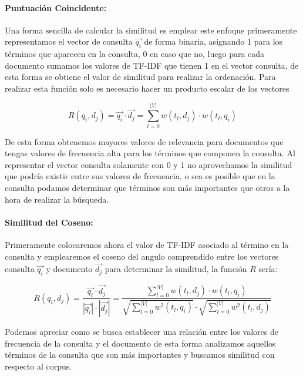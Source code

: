 \documentclass[runningheads,a4paper]{llncs}
\begin{document}
\paragraph{Puntuación Coincidente:} Una forma sencilla de calcular la similitud es emplear este enfoque primeramente representamos el vector de consulta $\overrightarrow{q_i}$ de forma binaria, asignando 1 para los términos que aparecen en la consulta, 0 en caso que no, luego para cada documento sumamos los valores de TF-IDF que tienen 1 en el vector consulta, de esta forma se obtiene el valor de similitud para realizar la ordenación.
Para realizar esta función solo es necesario hacer un producto escalar de los vectores

\begin{equation}
	R(q_i, d_j) = \overrightarrow{q_i} \cdot \overrightarrow{d_j} = \sum_{l = 0}^{|V|} w(t_l, d_j) \cdot w(t_l, q_i)
\end{equation}

De esta forma obtenemos mayores valores de relevancia para documentos que tengas valores de frecuencia alta para los términos que componen la consulta. Al representar el vector consulta solamente con 0 y 1 no aprovechamos la similitud que podría existir entre sus valores de frecuencia, o sea es posible que en la consulta podamos determinar que términos son más importantes que otros a la hora de realizar la búsqueda. 

\paragraph{Similitud del Coseno:} Primeramente colocaremos ahora el valor de TF-IDF asociado al término en la consulta y emplearemos el coseno del angulo comprendido entre los vectores consulta $\overrightarrow{q_i}$ y documento $\overrightarrow{d_j}$ para determinar la similitud, la función $R$ sería:

\begin{equation}
	R(q_i, d_j) = \frac{\overrightarrow{q_i} \cdot \overrightarrow{d_j}}{|\overrightarrow{q_i}| \cdot |\overrightarrow{d_j}|} = \frac{\sum_{l = 0}^{|V|} w(t_l, d_j) \cdot w(t_l, q_i)}{\sqrt{\sum_{l = 0}^{|V|} w^2(t_l, q_i)} \cdot \sqrt{\sum_{l = 0}^{|V|} w^2(t_l, d_j)}}
\end{equation}

Podemos apreciar como se busca establecer una relación entre los valores de frecuencia de la consulta y el documento de esta forma analizamos aquellos términos de la consulta que son más importantes y buscamos similitud con respecto al corpus.
\end{document}
